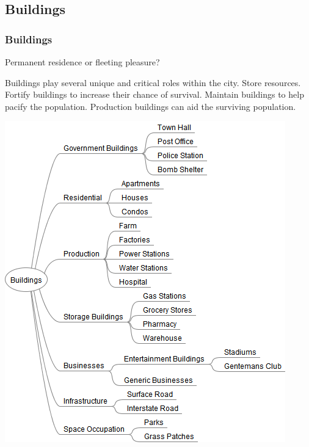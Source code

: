 \documentclass[ascpectratio=169]{beamer}
\begin{document}

\subsection{Buildings}


\begin{frame}

  \frametitle{Buildings}

  \begin{center}
    {\large Permanent residence or fleeting pleasure?}
  \end{center}

  \begin{multicols}{2}

  \begin{outline}
    \1 Buildings play several unique and critical roles within the city.
    \1 Store resources.
    \1 Fortify buildings to increase their chance of survival.
    \1 Maintain buildings to help pacify the population.
    \1 Production buildings can aid the surviving population.
  \end{outline}

  \columnbreak

  \begin{center}
    \includegraphics[scale=0.34, trim=4cm 0 4.5cm 0]{../../Diagrams/Buildings/Buildings.png}
  \end{center}

  \end{multicols}

\end{frame}
\end{document}
